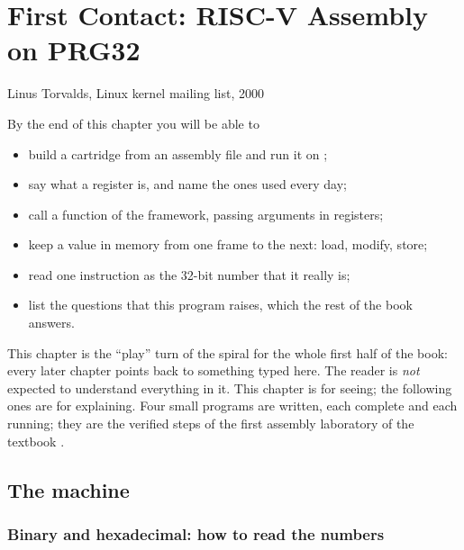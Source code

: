 \chapter{First Contact: RISC-V Assembly on PRG32}
\label{ch:firstcontact}

  {Linus Torvalds, Linux kernel mailing list, 2000}

\begin{chapgoals}
By the end of this chapter you will be able to
\begin{itemize}
\item build a cartridge from an assembly file and run it on \prg;
\item say what a register is, and name the ones used every day;
\item call a function of the framework, passing arguments in registers;
\item keep a value in memory from one frame to the next: load, modify, store;
\item read one instruction as the 32-bit number that it really is;
\item list the questions that this program raises, which the rest of the book answers.
\end{itemize}
\end{chapgoals}


This chapter is the ``play'' turn of the spiral for the whole first half of
the book: every later chapter points back to something typed here. The reader
is \emph{not} expected to understand everything in it. This chapter is for
seeing; the following ones are for explaining. Four small programs are
written, each complete and each running; they are the verified steps of the
first assembly laboratory of the \prg textbook \citep{prg32textbook}.

\section{The machine}

\subsection{Binary and hexadecimal: how to read the numbers}

